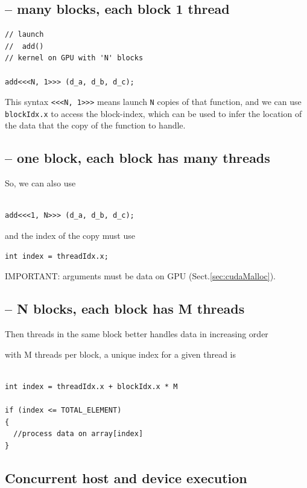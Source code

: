 \subsection{-- many blocks, each block 1 thread}

\begin{verbatim}
// launch  
//  add()
// kernel on GPU with 'N' blocks

add<<<N, 1>>> (d_a, d_b, d_c);
\end{verbatim}

This syntax \verb!<<<N, 1>>>! means launch \verb!N! copies of that function, and
we can use \verb!blockIdx.x! to access the block-index, which can be used to
infer the location of the data that the copy of the function to handle. 

\subsection{-- one block, each block has many threads}

So, we can also use
\begin{verbatim}

add<<<1, N>>> (d_a, d_b, d_c);
\end{verbatim}
and the index of the copy must use
\begin{verbatim}
int index = threadIdx.x; 
\end{verbatim}


IMPORTANT: arguments must be data on GPU (Sect.\ref{sec:cudaMalloc}). 

\subsection{-- N blocks, each block has M threads}

Then threads in the same block better handles data  in increasing order

with M threads per block, a unique index for a given thread is
\begin{verbatim}

int index = threadIdx.x + blockIdx.x * M

if (index <= TOTAL_ELEMENT)
{
  //process data on array[index]
}
\end{verbatim}

\subsection{Concurrent host and device execution}


